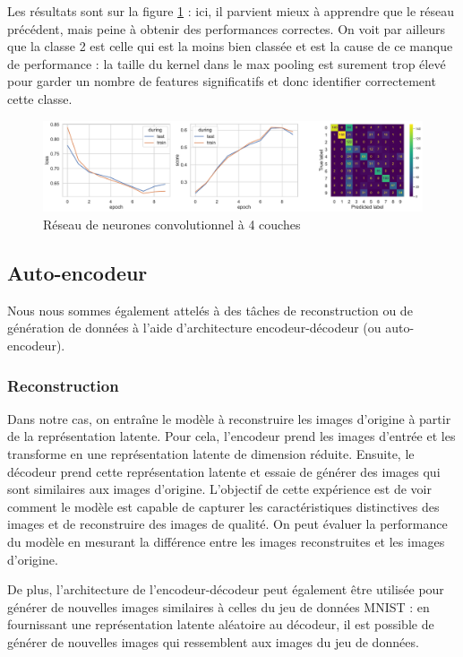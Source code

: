 \documentclass{article}
\begin{document}
Les résultats sont sur la figure \ref*{fig:conv4layers} : ici, il parvient mieux à apprendre que le réseau précédent, mais peine à obtenir des performances correctes. On voit par ailleurs que la classe 2 est celle qui est la moins bien classée et est la cause de ce manque de performance : la taille du kernel dans le max pooling est surement trop élevé pour garder un nombre de features significatifs et donc identifier correctement cette classe.

\begin{figure}[htbp]
    \centering
    \includegraphics[width=\textwidth]{conv/conv_4layers.pdf}
    \caption{Réseau de neurones convolutionnel à 4 couches}
    \label{fig:conv4layers}
\end{figure}

\subsection{Auto-encodeur}

Nous nous sommes également attelés à des tâches de reconstruction ou de génération de données à l'aide d'architecture encodeur-décodeur (ou auto-encodeur). 

\subsubsection{Reconstruction}

Dans notre cas, on entraîne le modèle à reconstruire les images d'origine à partir de la représentation latente. Pour cela, l'encodeur prend les images d'entrée et les transforme en une représentation latente de dimension réduite. Ensuite, le décodeur prend cette représentation latente et essaie de générer des images qui sont similaires aux images d'origine. L'objectif de cette expérience est de voir comment le modèle est capable de capturer les caractéristiques distinctives des images et de reconstruire des images de qualité. On peut évaluer la performance du modèle en mesurant la différence entre les images reconstruites et les images d'origine.

De plus, l'architecture de l'encodeur-décodeur peut également être utilisée pour générer de nouvelles images similaires à celles du jeu de données MNIST : en fournissant une représentation latente aléatoire au décodeur, il est possible de générer de nouvelles images qui ressemblent aux images du jeu de données.
\end{document}
